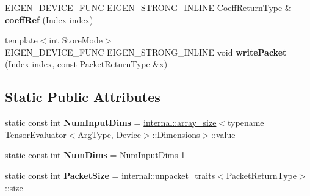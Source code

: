 \begin{DoxyCompactItemize}
\item 
\mbox{\label{struct_eigen_1_1_tensor_evaluator_3_01_tensor_chipping_op_3_01_dim_id_00_01_arg_type_01_4_00_01_device_01_4_a9d096006cff98bea766a8cd0f2b6aa25}} 
E\+I\+G\+E\+N\+\_\+\+D\+E\+V\+I\+C\+E\+\_\+\+F\+U\+NC E\+I\+G\+E\+N\+\_\+\+S\+T\+R\+O\+N\+G\+\_\+\+I\+N\+L\+I\+NE Coeff\+Return\+Type \& {\bfseries coeff\+Ref} (Index index)
\item 
\mbox{\label{struct_eigen_1_1_tensor_evaluator_3_01_tensor_chipping_op_3_01_dim_id_00_01_arg_type_01_4_00_01_device_01_4_acc780b85470b85dd5955ed3afa0f680f}} 
{\footnotesize template$<$int Store\+Mode$>$ }\\E\+I\+G\+E\+N\+\_\+\+D\+E\+V\+I\+C\+E\+\_\+\+F\+U\+NC E\+I\+G\+E\+N\+\_\+\+S\+T\+R\+O\+N\+G\+\_\+\+I\+N\+L\+I\+NE void {\bfseries write\+Packet} (Index index, const \hyperlink{group___sparse_core___module}{Packet\+Return\+Type} \&x)
\end{DoxyCompactItemize}
\subsection*{Static Public Attributes}
\begin{DoxyCompactItemize}
\item 
\mbox{\label{struct_eigen_1_1_tensor_evaluator_3_01_tensor_chipping_op_3_01_dim_id_00_01_arg_type_01_4_00_01_device_01_4_ac3fae082f3c30b0d6039b0b130b0f6ba}} 
static const int {\bfseries Num\+Input\+Dims} = \hyperlink{struct_eigen_1_1internal_1_1array__size}{internal\+::array\+\_\+size}$<$typename \hyperlink{struct_eigen_1_1_tensor_evaluator}{Tensor\+Evaluator}$<$Arg\+Type, Device$>$\+::\hyperlink{struct_eigen_1_1_d_sizes}{Dimensions}$>$\+::value
\item 
\mbox{\label{struct_eigen_1_1_tensor_evaluator_3_01_tensor_chipping_op_3_01_dim_id_00_01_arg_type_01_4_00_01_device_01_4_a72de9d2c90d1cc80377ca03bda21e851}} 
static const int {\bfseries Num\+Dims} = Num\+Input\+Dims-\/1
\item 
\mbox{\label{struct_eigen_1_1_tensor_evaluator_3_01_tensor_chipping_op_3_01_dim_id_00_01_arg_type_01_4_00_01_device_01_4_afecbf5ee5b172a9db08a496883202545}} 
static const int {\bfseries Packet\+Size} = \hyperlink{struct_eigen_1_1internal_1_1unpacket__traits}{internal\+::unpacket\+\_\+traits}$<$\hyperlink{group___sparse_core___module}{Packet\+Return\+Type}$>$\+::size
\end{DoxyCompactItemize}
